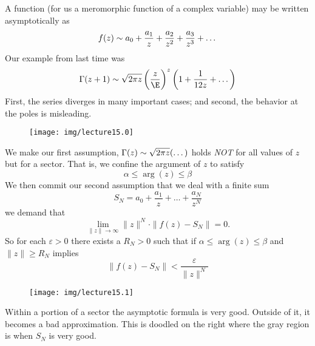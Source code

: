 
A function (for us a meromorphic function of a complex variable)
may be written asymptotically as
\begin{equation}
f(z)\sim a_{0}+\frac{a_{1}}{z}+\frac{a_{2}}{z^{2}}+\frac{a_{3}}{z^{3}}+\dots
\end{equation}
Our example from last time was
\begin{equation}
\Gamma(z+1)\asymptote\sqrt{2\pi z}\left(\frac{z}{\E}\right)^{z}\left(1+\frac{1}{12z}+\dots\right)
\end{equation}
First, the series diverges in many important cases; and second,
the behavior at the poles is misleading.

\begin{wrapfigure}{l}{1in}
\vspace{-24pt}
\begin{center}
\texttt{[image: img/lecture15.0]}
\end{center}
\vspace{-20pt}
\end{wrapfigure}
We make our first assumption, $\Gamma(z)\sim\sqrt{2\pi
  z}(\dots)$ holds \emph{NOT} for all values of $z$ but for a
sector. That is, we confine the argument of $z$ to satisfy
\begin{equation}
\alpha\leq\arg(z)\leq\beta
\end{equation}
We then commit our second assumption that we deal with a finite
sum
\begin{equation}
S_{N}=a_{0}+\frac{a_{1}}{z}+\dots+\frac{a_{N}}{z^{N}}
\end{equation}
we demand that
\begin{equation}
\lim_{\|z\|\to\infty}\|z\|^{N}\cdot\|f(z)-S_{N}\|=0.
\end{equation}
So for each $\varepsilon>0$ there exists a $R_{N}>0$ such that if
$\alpha\leq\arg(z)\leq\beta$ and $\|z\|\geq R_{N}$ implies
\begin{equation}
\|f(z)-S_{N}\|<\frac{\varepsilon}{\|z\|^{N}}
\end{equation}

\begin{wrapfigure}{r}{1in}
\vspace{-24pt}
\begin{center}
\texttt{[image: img/lecture15.1]}
\end{center}
\vspace{-20pt}
\end{wrapfigure}
Within a portion of a sector the asymptotic formula is very
good. Outside of it, it becomes a bad approximation. This is
doodled on the right where the gray region is when $S_{N}$ is
very good.

